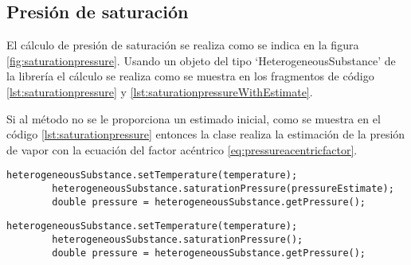 \subsection{Presión de saturación}\label{subsec:saturationpressure}

	El cálculo de presión de saturación se realiza como se indica en la figura \ref{fig:saturationpressure}. Usando un objeto del tipo `HeterogeneousSubstance' de la librería \Materia el cálculo se realiza como se muestra en los fragmentos de código \ref{lst:saturationpressure} y \ref{lst:saturationpressureWithEstimate}.

	Si al método no se le proporciona un estimado inicial, como se muestra en el código \ref{lst:saturationpressure} entonces la clase realiza la estimación de la presión de vapor con la ecuación del factor acéntrico \ref{eq:pressureacentricfactor}. 

	\begin{lstlisting}[label={lst:saturationpressureWithEstimate},caption={Cálculo de la presión de saturación proporcionando un estimado inicial.}]
		heterogeneousSubstance.setTemperature(temperature);
		heterogeneousSubstance.saturationPressure(pressureEstimate);
		double pressure = heterogeneousSubstance.getPressure();
	\end{lstlisting}


	\begin{lstlisting}[label={lst:saturationpressure},caption={Cálculo de la presión de saturación.}]
		heterogeneousSubstance.setTemperature(temperature);
		heterogeneousSubstance.saturationPressure();
		double pressure = heterogeneousSubstance.getPressure();
	\end{lstlisting}


